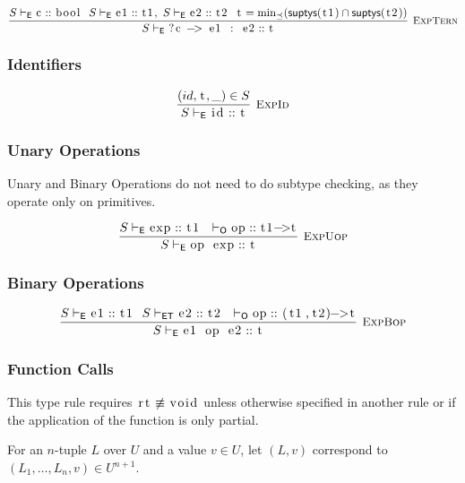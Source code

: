 \documentclass{article}
\newcommand{\code}[1]{\lstinline[columns=fixed]{#1}}
\newcommand{\drmrule}[5]{\frac{#1}{#2\vdash_{\mathsf{#3}}#4}\textsc{\ \small{#5}}}
\newcommand{\ruleapp}[1]{\vdash_{\mathsf{#1}}}
\newcommand{\mc}[1]{\textnormal{\code{#1}}}
\begin{document}
				\begin{align*}
					\drmrule{S\ruleapp{E}\mc{c}::\mc{bool}\ \ S\ruleapp{E}\mc{e1}::\mc{t1},\ S\ruleapp{E}\mc{e2}::\mc{t2}\ \ \mc{t}=\min_\preceq(\mathsf{suptys}(\mc{t1})\cap\mathsf{suptys}(\mc{t2}))}{S}{E}{\mc{?c -> e1 : e2} :: \mc{t}}{ExpTern}
				\end{align*}
			
			\subsubsection{Identifiers}
			
				\begin{align*}
					\drmrule{(id,\mc{t},\_)\in S}{S}{E}{\mc{id} :: \mc{t}}{ExpId}
				\end{align*}
			
			\subsubsection{Unary Operations}
			
				Unary and Binary Operations do not need to do subtype checking, as they operate only on primitives.
			
				\begin{align*}
					\drmrule{S\ruleapp{E}\mc{exp}::\mc{t1}\ \ \ruleapp{O}\mc{op}::\mc{t1->t}}{S}{E}{\mc{op exp}::\mc{t}}{ExpUop}
				\end{align*}
			
			\subsubsection{Binary Operations}
			
				\begin{align*}
					\drmrule{S\ruleapp{E}\mc{e1}::\mc{t1}\ \ S\ruleapp{ET}\mc{e2}::\mc{t2}\ \ \ruleapp{O}\mc{op}::\mc{(t1,t2)->t}}{S}{E}{\mc{e1 op e2} :: \mc{t}}{ExpBop}
				\end{align*}
			
			\subsubsection{Function Calls}
			
				This type rule requires $\mc{rt}\not\equiv\mc{void}$ unless otherwise specified in another rule or if the application of the function is only partial.
				
				For an $n$-tuple $L$ over $U$ and a value $v\in U$, let $(L,v)$ correspond to $(L_1,\dots,L_n,v)\in U^{n+1}$.
			
\end{document}
